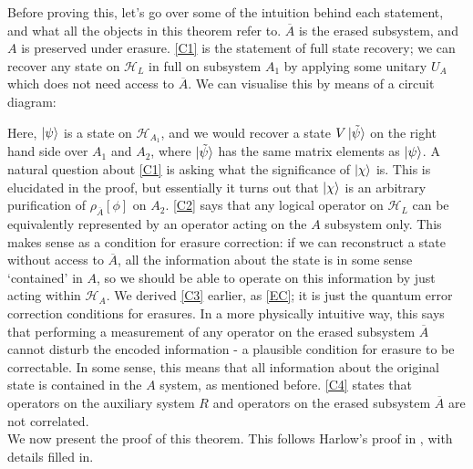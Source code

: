 \documentclass[12pt,a4paper]{report}
\numberwithin{equation}{section}
\newcommand{\ol}[1]{\overline{#1}}
\theoremstyle{definition}
\theoremstyle{theorem}
\theoremstyle{theorem}
\theoremstyle{example}
\theoremstyle{definition}
\begin{document}
Before proving this, let's go over some of the intuition behind each statement, and what all the objects in this theorem refer to. $\ol{A}$ is the erased subsystem, and $A$ is preserved under erasure. \ref{C1} is the statement of full state recovery; we can recover any state on $\mathcal{H}_{L}$ in full on subsystem $A_{1}$ by applying some unitary $U_{A}$ which does not need access to $\ol{A}$. We can visualise this by means of a circuit diagram:
\begin{figure}[H] 
	\centering
\end{figure}
Here, $\ket{\psi}$ is a state on $\mathcal{H}_{A_{1}}$, and we would recover a state $V\ket{\tilde{\psi}}$ on the right hand side over $A_{1}$ and $A_{2}$, where $\ket{\tilde{\psi}}$ has the same matrix elements as $\ket{\psi}$. A natural question about \ref{C1} is asking what the significance of $\ket{\chi}$ is. This is elucidated in the proof, but essentially it turns out that $\ket{\chi}$ is an arbitrary purification of $\rho_{\ol{A}}[\phi]$ on $A_{2}$. \ref{C2} says that any logical operator on $\mathcal{H}_{L}$ can be equivalently represented by an operator acting on the $A$ subsystem only. This makes sense as a condition for erasure correction: if we can reconstruct a state without access to $\ol{A}$, all the information about the state is in some sense `contained' in $A$, so we should be able to operate on this information by just acting within $\mathcal{H}_{A}$. We derived \ref{C3} earlier, as \ref{EC}; it is just the quantum error correction conditions for erasures. In a more physically intuitive way, this says that performing a measurement of any operator on the erased subsystem $\ol{A}$ cannot disturb the encoded information - a plausible condition for erasure to be correctable. In some sense, this means that all information about the original state is contained in the $A$ system, as mentioned before. \ref{C4} states that operators on the auxiliary system $R$ and operators on the erased subsystem $\ol{A}$ are not correlated.\\
We now present the proof of this theorem. This follows Harlow's proof in \cite{Harlow}, with details filled in.
\end{document}
